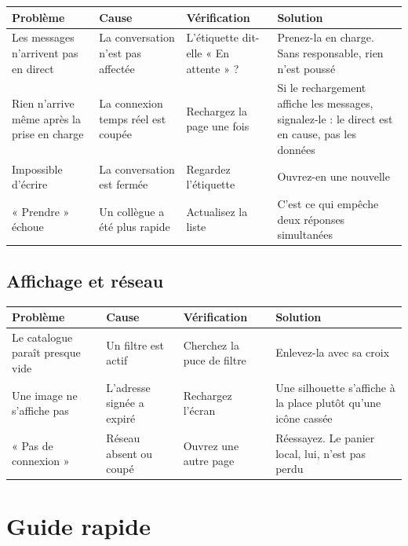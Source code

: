 \documentclass[11pt,a4paper]{report}
\begin{document}
\begin{longtable}{@{}p{3.6cm} p{3.4cm} p{3.4cm} p{3.8cm}@{}}
\toprule
\bfseries Problème & \bfseries Cause & \bfseries Vérification & \bfseries Solution \\
\midrule
\endhead
Les messages n'arrivent pas en direct
  & La conversation n'est pas affectée
  & L'étiquette dit-elle « En attente » ?
  & Prenez-la en charge. Sans responsable, rien n'est poussé \\[4pt]
Rien n'arrive même après la prise en charge
  & La connexion temps réel est coupée
  & Rechargez la page une fois
  & Si le rechargement affiche les messages, signalez-le : le direct est en
    cause, pas les données \\[4pt]
Impossible d'écrire
  & La conversation est fermée
  & Regardez l'étiquette
  & Ouvrez-en une nouvelle \\[4pt]
« Prendre » échoue
  & Un collègue a été plus rapide
  & Actualisez la liste
  & C'est ce qui empêche deux réponses simultanées \\
\bottomrule
\end{longtable}

\section{Affichage et réseau}

\begin{longtable}{@{}p{3.6cm} p{3.4cm} p{3.4cm} p{3.8cm}@{}}
\toprule
\bfseries Problème & \bfseries Cause & \bfseries Vérification & \bfseries Solution \\
\midrule
\endhead
Le catalogue paraît presque vide
  & Un filtre est actif
  & Cherchez la puce de filtre
  & Enlevez-la avec sa croix \\[4pt]
Une image ne s'affiche pas
  & L'adresse signée a expiré
  & Rechargez l'écran
  & Une silhouette s'affiche à la place plutôt qu'une icône cassée \\[4pt]
« Pas de connexion »
  & Réseau absent ou coupé
  & Ouvrez une autre page
  & Réessayez. Le panier local, lui, n'est pas perdu \\
\bottomrule
\end{longtable}

\chapter{Guide rapide}
\label{ch:rapide}
\end{document}
